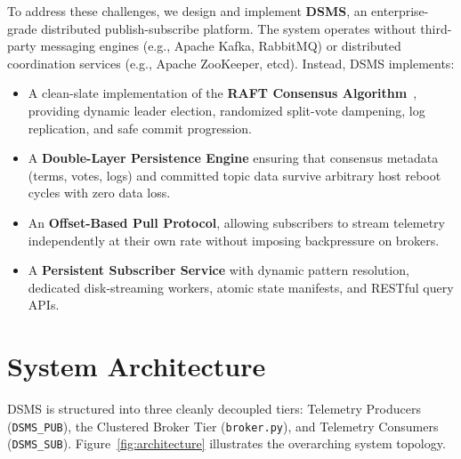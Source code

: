 \documentclass[11pt,a4paper]{article}
\begin{document}
To address these challenges, we design and implement \textbf{DSMS}, an enterprise-grade distributed publish-subscribe platform. The system operates without third-party messaging engines (e.g., Apache Kafka, RabbitMQ) or distributed coordination services (e.g., Apache ZooKeeper, etcd). Instead, DSMS implements:
\begin{itemize}[leftmargin=*]
    \item A clean-slate implementation of the \textbf{RAFT Consensus Algorithm}~\cite{ongaro2014raft}, providing dynamic leader election, randomized split-vote dampening, log replication, and safe commit progression.
    \item A \textbf{Double-Layer Persistence Engine} ensuring that consensus metadata (terms, votes, logs) and committed topic data survive arbitrary host reboot cycles with zero data loss.
    \item An \textbf{Offset-Based Pull Protocol}, allowing subscribers to stream telemetry independently at their own rate without imposing backpressure on brokers.
    \item A \textbf{Persistent Subscriber Service} with dynamic pattern resolution, dedicated disk-streaming workers, atomic state manifests, and RESTful query APIs.
\end{itemize}

\section{System Architecture}
\label{sec:architecture}
DSMS is structured into three cleanly decoupled tiers: Telemetry Producers (\texttt{DSMS\_PUB}), the Clustered Broker Tier (\texttt{broker.py}), and Telemetry Consumers (\texttt{DSMS\_SUB}). Figure~\ref{fig:architecture} illustrates the overarching system topology.
\end{document}
